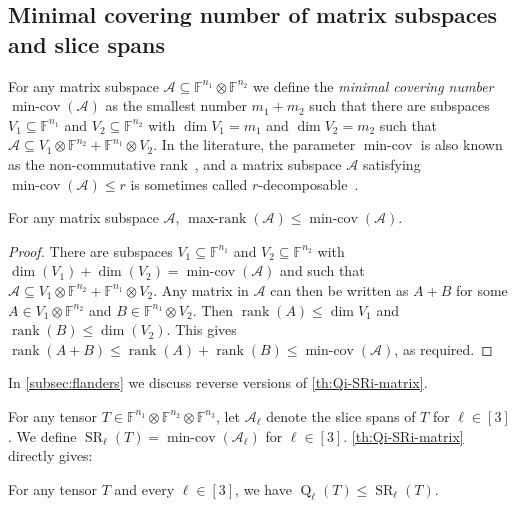 \documentclass{daj}
\DeclareMathOperator{\subrank}{Q}
\DeclareMathOperator{\slicerank}{SR}
\newcommand{\FF}{\mathbb{F}}
\DeclareMathOperator{\rank}{rank} \DeclareMathOperator{\col}{colspan}
\DeclareMathOperator{\maxrank}{max-rank}
\DeclareMathOperator{\mincov}{min-cov}
\begin{document}
%
\subsection{Minimal covering number of matrix subspaces and slice spans}\label{subsec:mincov}

For any matrix subspace $\mathcal{A} \subseteq \FF^{n_1} \otimes \FF^{n_2}$ we define the \emph{minimal covering number} $\mincov(\mathcal{A})$ as 
%
%
    the smallest number $m_1 + m_2$ such that there are subspaces $V_1 \subseteq \FF^{n_1}$ and $V_2 \subseteq \FF^{n_2}$ with $\dim V_1 = m_1$ and $\dim V_2 = m_2$ such that $\mathcal{A} \subseteq V_1 \otimes \FF^{n_2} + \FF^{n_1} \otimes V_2$.
%
In the literature, the parameter $\mincov$ is also known as the non-commutative rank~\cite{MR2123060}, and a matrix subspace $\mathcal{A}$ satisfying $\mincov(\mathcal{A}) \leq r$ is sometimes called $r$-decomposable~\cite{meshulam1985maximal}.

%


%
%
%
\begin{lemma}\label{th:Qi-SRi-matrix}
    For any matrix subspace $\mathcal{A}$, $\maxrank(\mathcal{A}) \leq \mincov(\mathcal{A})$.
\end{lemma}
\begin{proof}
%
    There are subspaces $V_1\subseteq\FF^{n_1}$ and $V_2\subseteq\FF^{n_2}$ with $\dim(V_1)+\dim(V_2)=\mincov(\mathcal{A})$ %
    and such that $\mathcal{A} \subseteq V_1\otimes\FF^{n_2}+\FF^{n_1}\otimes V_2$. Any matrix in $\mathcal{A}$ can then be written as $A+B$ for some $A\in V_1\otimes\FF^{n_2}$ and $B\in\FF^{n_1}\otimes V_2$. Then $\rank(A)\leq\dim{V_1}$ and $\rank(B)\leq\dim(V_2)$. This gives $\rank(A+B)\leq\rank(A)+\rank(B)\leq\mincov(\mathcal{A})$, as required.
\end{proof}

In \autoref{subsec:flanders} we discuss reverse versions of 
\autoref{th:Qi-SRi-matrix}. %

For any tensor $T \in \FF^{n_1} \otimes \FF^{n_2} \otimes \FF^{n_3}$, let $\mathcal{A}_\ell$ denote the slice spans of $T$ for $\ell \in [3]$. We define $\slicerank_\ell(T) = \mincov(\mathcal{A}_\ell)$ for $\ell \in [3]$.
\autoref{th:Qi-SRi-matrix} directly gives:

\begin{lemma}\label{th:Qi-SRi}
    For any tensor $T$ and every $\ell \in [3]$, we have $\subrank_\ell(T) \leq \slicerank_\ell(T)$.
\end{lemma}
\end{document}
